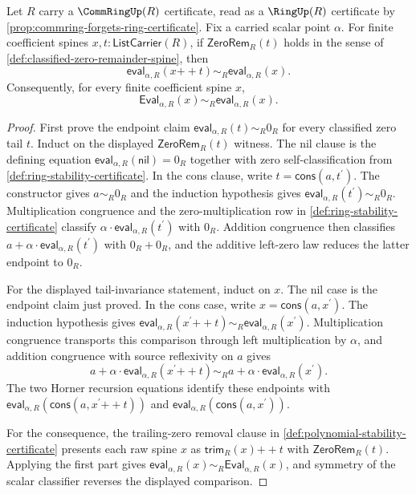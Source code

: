 \begin{lemma}
\label{lem:horner-evaluation-zero-tail-invariance}
Let $R$ carry a $\CommRingUp(R)$ certificate, read as a $\RingUp(R)$ certificate by \autoref{prop:commring-forgets-ring-certificate}. Fix a carried scalar point $\alpha$. For finite coefficient spines $x,t:\mathsf{ListCarrier}(R)$, if $\mathsf{ZeroRem}_R(t)$ holds in the sense of \autoref{def:classified-zero-remainder-spine}, then
$$
\mathsf{eval}_{\alpha,R}(x{++}t)\sim_R\mathsf{eval}_{\alpha,R}(x).
$$
Consequently, for every finite coefficient spine $x$,
$$
\mathsf{Eval}_{\alpha,R}(x)\sim_R\mathsf{eval}_{\alpha,R}(x).
$$
\end{lemma}
\begin{proof}
First prove the endpoint claim $\mathsf{eval}_{\alpha,R}(t)\sim_R0_R$ for every classified zero tail $t$. Induct on the displayed $\mathsf{ZeroRem}_R(t)$ witness. The nil clause is the defining equation $\mathsf{eval}_{\alpha,R}(\mathsf{nil})=0_R$ together with zero self-classification from \autoref{def:ring-stability-certificate}. In the cons clause, write $t=\mathsf{cons}(a,t^\prime)$. The constructor gives $a\sim_R0_R$ and the induction hypothesis gives $\mathsf{eval}_{\alpha,R}(t^\prime)\sim_R0_R$. Multiplication congruence and the zero-multiplication row in \autoref{def:ring-stability-certificate} classify $\alpha\cdot\mathsf{eval}_{\alpha,R}(t^\prime)$ with $0_R$. Addition congruence then classifies $a+\alpha\cdot\mathsf{eval}_{\alpha,R}(t^\prime)$ with $0_R+0_R$, and the additive left-zero law reduces the latter endpoint to $0_R$.

For the displayed tail-invariance statement, induct on $x$. The nil case is the endpoint claim just proved. In the cons case, write $x=\mathsf{cons}(a,x^\prime)$. The induction hypothesis gives $\mathsf{eval}_{\alpha,R}(x^\prime{++}t)\sim_R\mathsf{eval}_{\alpha,R}(x^\prime)$. Multiplication congruence transports this comparison through left multiplication by $\alpha$, and addition congruence with source reflexivity on $a$ gives
$$
a+\alpha\cdot\mathsf{eval}_{\alpha,R}(x^\prime{++}t)\sim_Ra+\alpha\cdot\mathsf{eval}_{\alpha,R}(x^\prime).
$$
The two Horner recursion equations identify these endpoints with $\mathsf{eval}_{\alpha,R}(\mathsf{cons}(a,x^\prime{++}t))$ and $\mathsf{eval}_{\alpha,R}(\mathsf{cons}(a,x^\prime))$.

For the consequence, the trailing-zero removal clause in \autoref{def:polynomial-stability-certificate} presents each raw spine $x$ as $\mathsf{trim}_R(x){++}t$ with $\mathsf{ZeroRem}_R(t)$. Applying the first part gives $\mathsf{eval}_{\alpha,R}(x)\sim_R\mathsf{Eval}_{\alpha,R}(x)$, and symmetry of the scalar classifier reverses the displayed comparison.
\end{proof}

